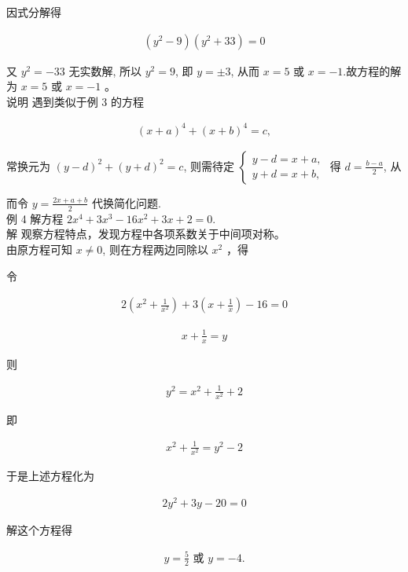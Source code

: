 \documentclass[10pt]{article}
\begin{document}
因式分解得

\begin{align*}
\left(y^{2}-9\right)\left(y^{2}+33\right)=0
\end{align*}

又 $y^{2}=-33$ 无实数解, 所以 $y^{2}=9$, 即 $y= \pm 3$, 从而 $x=5$ 或 $x=-1$.故方程的解为 $x=5$ 或 $x=-1$ 。\\
说明 遇到类似于例 3 的方程

\begin{align*}
(x+a)^{4}+(x+b)^{4}=c,
\end{align*}

常换元为 $(y-d)^{2}+(y+d)^{2}=c$, 则需待定 $\left\{\begin{array}{l}y-d=x+a, \\ y+d=x+b,\end{array}\right.$ 得 $d=\frac{b-a}{2}$, 从

而令 $y=\frac{2 x+a+b}{2}$ 代换简化问题.\\
例 4 解方程 $2 x^{4}+3 x^{3}-16 x^{2}+3 x+2=0$.\\
解 观察方程特点，发现方程中各项系数关于中间项对称。\\
由原方程可知 $x \neq 0$, 则在方程两边同除以 $x^{2}$ ，得

令

\begin{align*}
2\left(x^{2}+\frac{1}{x^{2}}\right)+3\left(x+\frac{1}{x}\right)-16=0
\end{align*}

\begin{align*}
x+\frac{1}{x}=y
\end{align*}

则

\begin{align*}
y^{2}=x^{2}+\frac{1}{x^{2}}+2
\end{align*}

即

\begin{align*}
x^{2}+\frac{1}{x^{2}}=y^{2}-2
\end{align*}

于是上述方程化为

\begin{align*}
2 y^{2}+3 y-20=0
\end{align*}

解这个方程得

\begin{align*}
y=\frac{5}{2} \text { 或 } y=-4 .
\end{align*}
\end{document}
